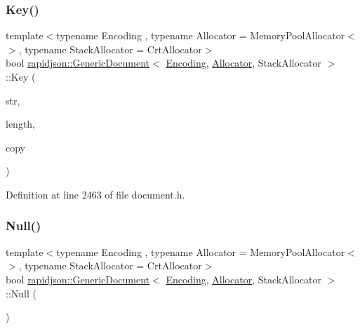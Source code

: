 \subsubsection{\texorpdfstring{Key()}{Key()}}
{\footnotesize\ttfamily template$<$typename Encoding , typename Allocator  = Memory\+Pool\+Allocator$<$$>$, typename Stack\+Allocator  = Crt\+Allocator$>$ \\
bool \mbox{\hyperlink{classrapidjson_1_1_generic_document}{rapidjson\+::\+Generic\+Document}}$<$ \mbox{\hyperlink{classrapidjson_1_1_encoding}{Encoding}}, \mbox{\hyperlink{classrapidjson_1_1_allocator}{Allocator}}, Stack\+Allocator $>$\+::Key (\begin{DoxyParamCaption}\item[{const \mbox{\hyperlink{classrapidjson_1_1_generic_value_adcdbc7fa85a9a41b78966d7e0dcc2ac4}{Ch}} $\ast$}]{str,  }\item[{\mbox{\hyperlink{namespacerapidjson_a44eb33eaa523e36d466b1ced64b85c84}{Size\+Type}}}]{length,  }\item[{bool}]{copy }\end{DoxyParamCaption})}



Definition at line 2463 of file document.\+h.


\begin{DoxyCode}{0}

\end{DoxyCode}
\mbox{\label{classrapidjson_1_1_generic_document_ab53214e81f7402edbe57829cb1ee6c87}} 
\subsubsection{\texorpdfstring{Null()}{Null()}}
{\footnotesize\ttfamily template$<$typename Encoding , typename Allocator  = Memory\+Pool\+Allocator$<$$>$, typename Stack\+Allocator  = Crt\+Allocator$>$ \\
bool \mbox{\hyperlink{classrapidjson_1_1_generic_document}{rapidjson\+::\+Generic\+Document}}$<$ \mbox{\hyperlink{classrapidjson_1_1_encoding}{Encoding}}, \mbox{\hyperlink{classrapidjson_1_1_allocator}{Allocator}}, Stack\+Allocator $>$\+::Null (\begin{DoxyParamCaption}{ }\end{DoxyParamCaption})}



